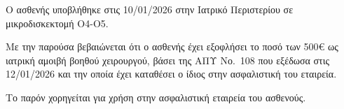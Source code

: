 \documentclass[10pt,greek]{article}
\begin{document}
\begin{PatientInfo}
\end{PatientInfo}

Ο ασθενής υποβλήθηκε στις 10/01/2026 στην Ιατρικό Περιστερίου σε μικροδισκεκτομή Ο4-Ο5.

Με την παρούσα βεβαιώνεται ότι ο ασθενής έχει εξοφλήσει το ποσό των 500€ ως ιατρική αμοιβή βοηθού χειρουργού, βάσει της ΑΠΥ Νο.\ 108 που εξέδωσα στις 12/01/2026 και την οποία έχει καταθέσει ο ίδιος στην ασφαλιστική του εταιρεία.

Το παρόν χορηγείται για χρήση στην ασφαλιστική εταιρεία του ασθενούς.
\end{document}
